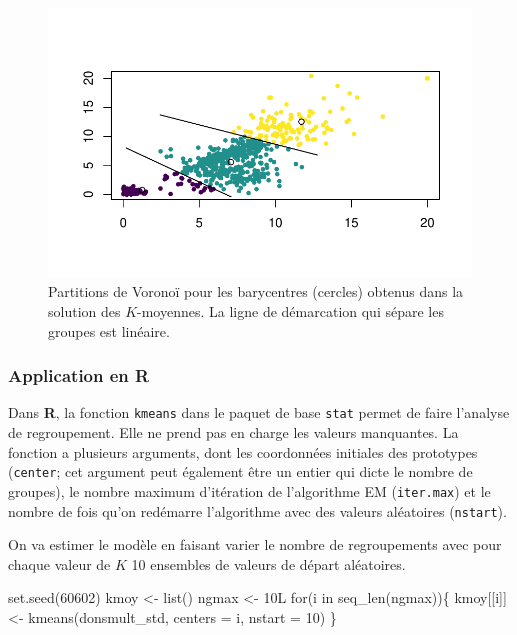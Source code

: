 \documentclass[
  11pt,
  letterpaper,
]{scrbook}
\newenvironment{Shaded}{\begin{snugshade}}{\end{snugshade}}
\newcommand{\AttributeTok}[1]{\textcolor[rgb]{0.40,0.45,0.13}{#1}}
\newcommand{\ControlFlowTok}[1]{\textcolor[rgb]{0.00,0.23,0.31}{#1}}
\newcommand{\DecValTok}[1]{\textcolor[rgb]{0.68,0.00,0.00}{#1}}
\newcommand{\FunctionTok}[1]{\textcolor[rgb]{0.28,0.35,0.67}{#1}}
\newcommand{\NormalTok}[1]{\textcolor[rgb]{0.00,0.23,0.31}{#1}}
\newcommand{\OtherTok}[1]{\textcolor[rgb]{0.00,0.23,0.31}{#1}}
\theoremstyle{definition}
\theoremstyle{remark}
\begin{document}
\begin{figure}[ht!]

{\centering \includegraphics{./03-regroupements_files/figure-pdf/fig-voronoikmoy-1.pdf}

}

\caption{\label{fig-voronoikmoy}Partitions de Voronoï pour les
barycentres (cercles) obtenus dans la solution des \(K\)-moyennes. La
ligne de démarcation qui sépare les groupes est linéaire.}

\end{figure}

\hypertarget{application-en-r}{%
\subsubsection{\texorpdfstring{Application en
\textbf{R}}{Application en R}}\label{application-en-r}}

Dans \textbf{R}, la fonction \texttt{kmeans} dans le paquet de base
\texttt{stat} permet de faire l'analyse de regroupement. Elle ne prend
pas en charge les valeurs manquantes. La fonction a plusieurs arguments,
dont les coordonnées initiales des prototypes (\texttt{center}; cet
argument peut également être un entier qui dicte le nombre de groupes),
le nombre maximum d'itération de l'algorithme EM (\texttt{iter.max}) et
le nombre de fois qu'on redémarre l'algorithme avec des valeurs
aléatoires (\texttt{nstart}).

On va estimer le modèle en faisant varier le nombre de regroupements
avec pour chaque valeur de \(K\) 10 ensembles de valeurs de départ
aléatoires.

\begin{Shaded}
\begin{Highlighting}[]
\FunctionTok{set.seed}\NormalTok{(}\DecValTok{60602}\NormalTok{)}
\NormalTok{kmoy }\OtherTok{\textless{}{-}} \FunctionTok{list}\NormalTok{()}
\NormalTok{ngmax }\OtherTok{\textless{}{-}}\NormalTok{ 10L}
\ControlFlowTok{for}\NormalTok{(i }\ControlFlowTok{in} \FunctionTok{seq\_len}\NormalTok{(ngmax))\{}
\NormalTok{ kmoy[[i]] }\OtherTok{\textless{}{-}} \FunctionTok{kmeans}\NormalTok{(donsmult\_std,}
                     \AttributeTok{centers =}\NormalTok{ i,}
                     \AttributeTok{nstart =} \DecValTok{10}\NormalTok{)}
\NormalTok{\}}
\end{Highlighting}
\end{Shaded}
\end{document}
